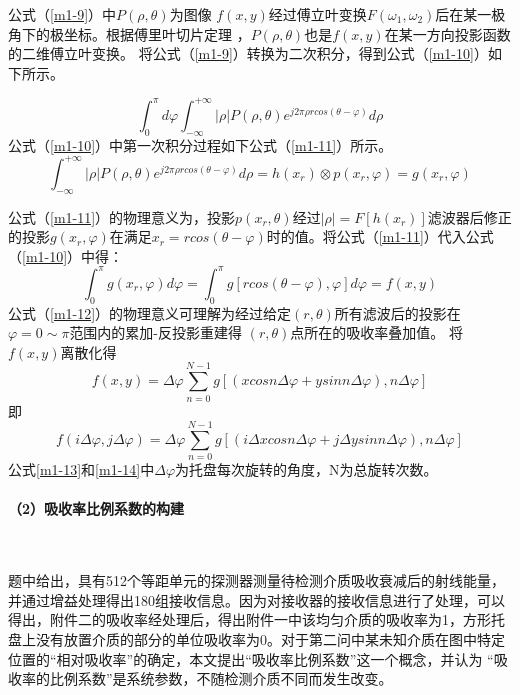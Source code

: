 \documentclass[withoutpreface,bwprint]{cumcmthesis} %
\begin{document}
公式（\ref{m1-9}）中$P(\rho,\theta)$为图像	$f(x,y)$经过傅立叶变换$F(\omega_1,\omega_2)$后在某一极角下的极坐标。根据傅里叶切片定理
，$P(\rho,\theta)$也是$f(x,y)$在某一方向投影函数的二维傅立叶变换。
将公式（\ref{m1-9}）转换为二次积分，得到公式（\ref{m1-10}）如下所示。

\begin{equation}
	\label{m1-10}
	\int_{0}^{\pi} d \varphi \int_{-\infty}^{+\infty} |\rho| P(\rho,\theta)e^{j2\pi\rho r cos (\theta - \varphi)} d\rho
\end{equation}
公式（\ref{m1-10}）中第一次积分过程如下公式（\ref{m1-11}）所示。
\begin{equation}
	\label{m1-11}
	\int_{-\infty}^{+\infty} |\rho| P(\rho,\theta)e^{j2\pi \rho r cos (\theta-\varphi)} d \rho = h(x_r)\otimes p(x_r,\varphi) = g(x_r,\varphi)
\end{equation}

公式（\ref{m1-11}）的物理意义为，投影$p(x_r,\theta)$经过$|\rho| = F[h(x_r)]$滤波器后修正的投影$g(x_r,\varphi)$在满足$x_r = r cos (\theta-\varphi)$时的值。将公式（\ref{m1-11}）代入公式（\ref{m1-10}）中得：
\begin{equation}
	\label{m1-12}
	\int_{0}^{\pi}g(x_r,\varphi)d\varphi = \int_{0}^{\pi} g[r cos (\theta-\varphi),\varphi]d\varphi = f(x,y)
\end{equation}
公式（\ref{m1-12}）的物理意义可理解为经过给定$(r,\theta)$所有滤波后的投影在$\varphi = 0 \sim \pi$范围内的累加-反投影重建得 $(r,\theta)$点所在的吸收率叠加值。
将$f(x,y)$离散化得
\begin{equation}
	\label{m1-13}
	f(x,y) = \Delta\varphi \sum\limits_{n=0}^{N-1} g[(x cos n \Delta\varphi + y sin n \Delta\varphi),n\Delta\varphi]
\end{equation}
即
\begin{equation}
\label{m1-14}
	f(i\Delta\varphi,j\Delta\varphi) = \Delta\varphi \sum\limits_{n=0}^{N-1} g[(i\Delta x cos n \Delta\varphi + j \Delta y sin n \Delta\varphi),n\Delta\varphi]
\end{equation}
公式\ref{m1-13}和\ref{m1-14}中$\Delta\varphi$为托盘每次旋转的角度，N为总旋转次数。

\paragraph*{（2）吸收率比例系数的构建}~\\
\par 题中给出，具有512个等距单元的探测器测量待检测介质吸收衰减后的射线能量，并通过增益处理得出180组接收信息。因为对接收器的接收信息进行了处理，可以得出，附件二的吸收率经处理后，得出附件一中该均匀介质的吸收率为1，方形托盘上没有放置介质的部分的单位吸收率为0。对于第二问中某未知介质在图中特定位置的“相对吸收率”的确定，本文提出“吸收率比例系数”这一个概念，并认为 “吸收率的比例系数”是系统参数，不随检测介质不同而发生改变。
\end{document}
